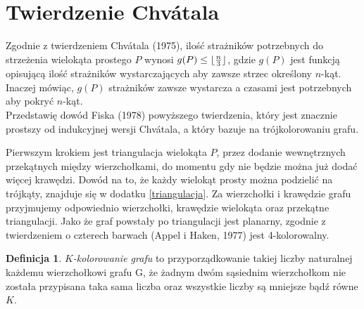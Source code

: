 \documentclass[brudnopis]{xmgr}
\DeclarePairedDelimiter\floor{\lfloor}{\rfloor}
\theoremstyle{definition}
\newtheorem{Definicja}{Definicja}
\begin{document}
\section{Twierdzenie Chv\'atala}
Zgodnie z twierdzeniem Chv\'atala (1975)\label{tw chvatala}, ilość strażników potrzebnych do strzeżenia wielokąta prostego $P$ wynosi $g(P) \le \floor{\frac{n}{3}}$, gdzie $g(P)$ jest funkcją opisującą ilość strażników wystarczających aby zawsze strzec określony $n$-kąt. Inaczej mówiąc, $g(P)$ strażników zawsze wystarcza a czasami jest potrzebnych aby pokryć $n$-kąt.
\\Przedstawię dowód Fiska (1978) powyższego twierdzenia, który jest znacznie prostszy od indukcyjnej wersji Chv\'atala, a który bazuje na trójkolorowaniu grafu. 

Pierwszym krokiem jest triangulacja wielokąta $P$, przez dodanie wewnętrznych przekątnych między wierzchołkami, do momentu gdy nie będzie można już dodać więcej krawędzi. 
Dowód na to, że każdy wielokąt prosty można podzielić na trójkąty, znajduje się w dodatku \ref{triangulacja}.
Za wierzchołki i krawędzie grafu przyjmujemy odpowiednio wierzchołki, krawędzie wielokąta oraz przekątne triangulacji. Jako że graf powstały po triangulacji jest planarny, zgodnie z twierdzeniem o czterech barwach (Appel i Haken, 1977) jest 4-kolorowalny.

\begin{Definicja} 
   \emph{$K$-kolorowanie grafu} to przyporządkowanie takiej liczby naturalnej każdemu wierzchołkowi grafu G, że żadnym dwóm sąsiednim wierzchołkom nie została przypisana taka sama liczba oraz wszystkie liczby są mniejsze bądź równe $K$.
\end{Definicja}
\end{document}
